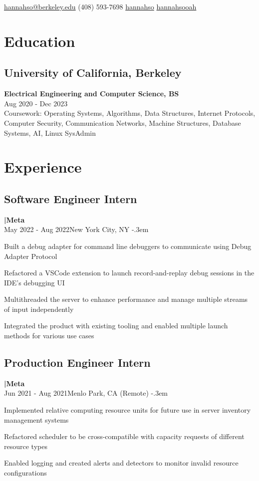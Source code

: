 \documentclass{article}
\makeatletter
\def\faEmail{{\FAFR \symbol{"F0E0}}} %
\def\faPhone{{\FAFR \symbol{"F095}}} %
\def\faLinkedin{{\FAB \symbol{"F08C}}} %
\def\faGithub{{\FAB \symbol{"F09B}}} %
\let\olditemize=\itemize \let\endolditemize=\enditemize
\renewenvironment{itemize}{\olditemize[topsep=0em] \itemsep-.3em}{\endolditemize}
\newcommand{\entry}[3]{\quad\textbf{|\quad#1}\\#2\qquad#3}
\renewcommand{\maketitle}{
  \begin{flushleft}
    \Huge\bfseries\theauthor
  \end{flushleft}
  \begin{bfseries}
    \faEmail    \hspace{1pt} \href{mailto:hannahso@berkeley.edu}{hannahso@berkeley.edu} \quad
    \faPhone    \hspace{1pt} (408) 593-7698 \quad
    \faLinkedin \hspace{1pt} \href{https://www.linkedin.com/in/hannahso}{hannahso} \quad
    \faGithub   \hspace{1pt} \href{https://github.com/hannahsooah/}{hannahsooah}
  \end{bfseries}
}
\makeatother
\begin{document}
\author{\color{titlecolor}Hannah S. Oh}
\maketitle


\section{Education}
\subsection{University of California, Berkeley}\quad\textbf{Electrical Engineering and Computer Science, BS}\\
{Aug 2020 - Dec 2023}\\
Coursework:
  Operating Systems,
  Algorithms,
  Data Structures,
  Internet Protocols,
  Computer Security,
  Communication Networks,
  Machine Structures,
  Database Systems,
  AI, 
  Linux SysAdmin


\section{Experience}

\subsection{Software Engineer Intern}
\entry{Meta}{May 2022 - Aug 2022}{New York City, NY}
\begin{itemize}
  \item Built a debug adapter for command line debuggers to communicate using Debug Adapter Protocol
  \item Refactored a VSCode extension to launch record-and-replay debug sessions in the IDE's debugging UI
  \item Multithreaded the server to enhance performance and manage multiple streams of input independently
  \item Integrated the product with existing tooling and enabled multiple launch methods for various use cases
\end{itemize}

\subsection{Production Engineer Intern}
\entry{Meta}{Jun 2021 - Aug 2021}{Menlo Park, CA (Remote)}
\begin{itemize}
  \item Implemented relative computing resource units for future use in server inventory management systems
  \item Refactored scheduler to be cross-compatible with capacity requests of different resource types
  \item Enabled logging and created alerts and detectors to monitor invalid resource configurations
\end{itemize}
\end{document}
